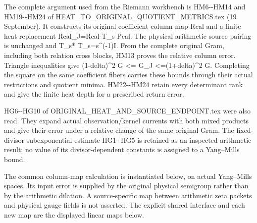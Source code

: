 \documentclass[11pt,a4paper]{article}
\renewcommand{\[}{\begingroup\small\originaldisplaystart}
\renewcommand{\]}{\originaldisplayend\endgroup}
\begin{document}
The complete argument used from the Riemann workbench is HM6-\/-HM14 and
HM19-\/-HM24 of
{H\allowbreak{}E\allowbreak{}A\allowbreak{}T\allowbreak{}\_\allowbreak{}T\allowbreak{}O\allowbreak{}\_\allowbreak{}O\allowbreak{}R\allowbreak{}I\allowbreak{}G\allowbreak{}I\allowbreak{}N\allowbreak{}A\allowbreak{}L\allowbreak{}\_\allowbreak{}Q\allowbreak{}U\allowbreak{}O\allowbreak{}T\allowbreak{}I\allowbreak{}E\allowbreak{}N\allowbreak{}T\allowbreak{}\_\allowbreak{}M\allowbreak{}E\allowbreak{}T\allowbreak{}R\allowbreak{}I\allowbreak{}C\allowbreak{}S\allowbreak{}.\allowbreak{}t\allowbreak{}e\allowbreak{}x\allowbreak{}}
(19 September). It constructs its original coefficient column map Rcal
and a finite heat replacement Rcal\_J=Rcal-T\_s Pcal. The physical
arithmetic source pairing is unchanged and T\_s* T\_s=s\^{}(-1)I. From
the complete original Gram, including both relation cross blocks, HM13
proves the relative column error. Triangle inequalities give
(1-delta)\^{}2 G \textless= G\_J \textless=(1+delta)\^{}2 G. Completing
the square on the same coefficient fibers carries these bounds through
their actual restrictions and quotient minima. HM22-\/-HM24 retain every
determinant rank and give the finite heat depth for a prescribed return
error.

HG6-\/-HG10 of
{O\allowbreak{}R\allowbreak{}I\allowbreak{}G\allowbreak{}I\allowbreak{}N\allowbreak{}A\allowbreak{}L\allowbreak{}\_\allowbreak{}H\allowbreak{}E\allowbreak{}A\allowbreak{}T\allowbreak{}\_\allowbreak{}A\allowbreak{}N\allowbreak{}D\allowbreak{}\_\allowbreak{}S\allowbreak{}O\allowbreak{}U\allowbreak{}R\allowbreak{}C\allowbreak{}E\allowbreak{}\_\allowbreak{}E\allowbreak{}N\allowbreak{}D\allowbreak{}P\allowbreak{}O\allowbreak{}I\allowbreak{}N\allowbreak{}T\allowbreak{}.\allowbreak{}t\allowbreak{}e\allowbreak{}x\allowbreak{}}
were also read. They expand actual
{o\allowbreak{}b\allowbreak{}s\allowbreak{}e\allowbreak{}r\allowbreak{}v\allowbreak{}a\allowbreak{}t\allowbreak{}i\allowbreak{}o\allowbreak{}n\allowbreak{}/\allowbreak{}k\allowbreak{}e\allowbreak{}r\allowbreak{}n\allowbreak{}e\allowbreak{}l\allowbreak{}}
currents with both mixed products and give their error under a relative
change of the same original Gram. The fixed-divisor subexponential
estimate HG1-\/-HG5 is retained as an inspected arithmetic result; no
value of its divisor-dependent constants is assigned to a Yang--Mills
bound.

The common column-map calculation is instantiated below, on actual
Yang--Mills spaces. Its input error is supplied by the original physical
semigroup rather than by the arithmetic dilation. A source-specific map
between arithmetic zeta packets and physical gauge fields is not
asserted. The explicit shared interface and each new map are the
displayed linear maps below.
\end{document}
